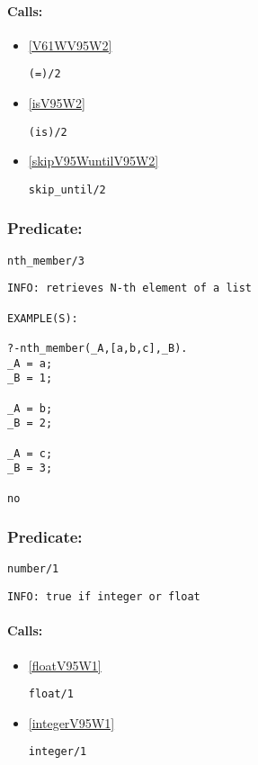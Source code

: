 \paragraph{Calls:} 
\begin{itemize}
\item \ref{V61WV95W2} 
\begin{verbatim}
(=)/2
\end{verbatim}

\item \ref{isV95W2} 
\begin{verbatim}
(is)/2
\end{verbatim}

\item \ref{skipV95WuntilV95W2} 
\begin{verbatim}
skip_until/2
\end{verbatim}

\end{itemize}

\subsubsection{Predicate:} \label{nthV95WmemberV95W3}

\begin{verbatim}
nth_member/3
\end{verbatim}

{\small \begin{verbatim}
INFO: retrieves N-th element of a list

EXAMPLE(S):

?-nth_member(_A,[a,b,c],_B).
_A = a;
_B = 1;

_A = b;
_B = 2;

_A = c;
_B = 3;

no

\end{verbatim}}

\subsubsection{Predicate:} \label{numberV95W1}

\begin{verbatim}
number/1
\end{verbatim}

{\small \begin{verbatim}
INFO: true if integer or float

\end{verbatim}}
\paragraph{Calls:} 
\begin{itemize}
\item \ref{floatV95W1} 
\begin{verbatim}
float/1
\end{verbatim}

\item \ref{integerV95W1} 
\begin{verbatim}
integer/1
\end{verbatim}

\end{itemize}
